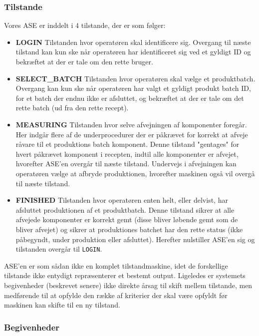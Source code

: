 \documentclass[a4paper]{article}
\begin{document}
\subsubsection{Tilstande} %

Vores ASE er inddelt i 4 tilstande, der er som følger:
\begin{itemize}
  \item \textbf{LOGIN} Tilstanden hvor operatøren skal identificere sig. Overgang til næste tilstand kan kun ske når operatøren har identificeret sig ved et gyldigt ID og bekræftet at der er tale om den rette bruger.
  \item \textbf{SELECT\_BATCH} Tilstanden hvor operatøren skal vælge et produktbatch. Overgang kan kun ske når operatøren har valgt et gyldigt produkt batch ID, for et batch der endnu ikke er afsluttet, og bekræftet at der er tale om det rette batch (ud fra den rette recept).
  \item \textbf{MEASURING} Tilstanden hvor selve afvejningen af komponenter foregår. Her indgår flere af de underprocedurer der er påkrævet for korrekt at afveje råvare til et produktions batch komponent. Denne tilstand "gentages" for hvert påkrævet komponent i recepten, indtil alle komponenter er afvejet, hvorefter ASE'en overgår til næste tilstand. Undervejs i afvejningen kan operatøren vælge at afbryde produktionen, hvorefter maskinen også vil overgå til næste tilstand.
  \item \textbf{FINISHED} Tilstanden hvor operatøren enten helt, eller delvist, har afsluttet produktionen af et produktbatch. Denne tilstand sikrer at alle afvejede komponenter er korrekt gemt (disse bliver løbende gemt som de bliver afvejet) og sikrer at produktiones batchet har den rette status (ikke påbegyndt, under produktion eller afsluttet). Herefter nulstiller ASE'en sig og tilstanden overgår til \texttt{LOGIN}.
\end{itemize}

ASE'en er som sådan ikke en komplet tilstandmaskine, idet de forskellige tilstande ikke entydigt repræsenterer et bestemt output. Ligeledes er systemets begivenheder (beskrevet senere) ikke direkte årsag til skift mellem tilstande, men medførende til at opfylde den række af kriterier der skal være opfyldt før maskinen kan skifte til en ny tilstand.


\subsubsection{Begivenheder} %
\end{document}
